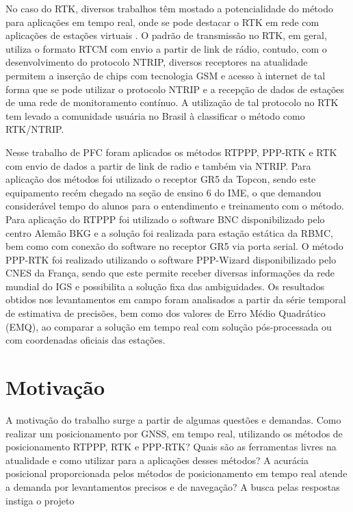No caso do RTK, diversos trabalhos têm mostado a potencialidade do método para aplicações em tempo real, onde se pode destacar o RTK em rede com aplicações de estações virtuais \citep{daniele}. O padrão de transmissão no RTK, em geral, utiliza o formato RTCM com envio a partir de link de rádio, contudo, com o desenvolvimento do protocolo NTRIP, diversos receptores na atualidade permitem a inserção de chips com tecnologia GSM e acesso à internet de tal forma que se pode utilizar o protocolo NTRIP e a recepção de dados de estações de uma rede de monitoramento contínuo. A utilização de tal protocolo no RTK tem levado a comunidade usuária no Brasil à classificar o método como RTK/NTRIP.


Nesse trabalho de PFC foram aplicados os métodos RTPPP, PPP-RTK e RTK com envio de dados a partir de link de radio e também via NTRIP. Para aplicação dos métodos foi utilizado o receptor GR5 da Topcon, sendo este equipamento recém chegado na seção de ensino 6 do IME, o que demandou considerável tempo do alunos para o entendimento e treinamento com o método. Para aplicação do RTPPP foi utilizado o software BNC disponibilizado pelo centro Alemão BKG e a solução foi realizada para estação estática da RBMC, bem como com conexão do software no receptor GR5 via porta serial. O método PPP-RTK foi realizado utilizando o software PPP-Wizard disponibilizado pelo CNES da França, sendo que este permite receber diversas informações da rede mundial do IGS e possibilita a solução fixa das ambiguidades. 
Os resultados obtidos nos levantamentos em campo foram analisados a partir da série temporal de estimativa de precisões, bem como dos valores de Erro Médio Quadrático (EMQ), ao comparar a solução em tempo real com solução pós-processada ou com coordenadas oficiais das estações. 




\section{Motivação}
\label{motivacao}
\noindent

A motivação do trabalho surge a partir de algumas questões e demandas. Como realizar um posicionamento por GNSS, em tempo real, utilizando os métodos de posicionamento RTPPP, RTK e PPP-RTK? Quais são as ferramentas livres na atualidade e como utilizar para a aplicações desses métodos? A acurácia posicional proporcionada pelos métodos de posicionamento em tempo real atende a demanda por levantamentos precisos e de navegação? A busca pelas respostas instiga o projeto

